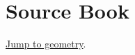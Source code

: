 \documentclass{article}
\begin{document}
\section{Source Book}\label{source-book}

\hypertarget{source-book}{}

\href{stage2.pdf\#geometry-basics}{Jump to geometry}.
\end{document}
